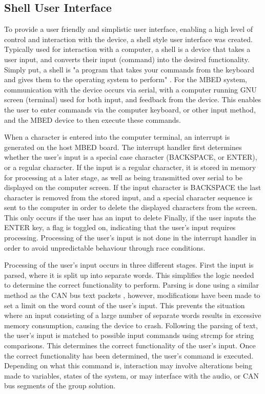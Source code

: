 \subsection*{Shell User Interface}

To provide a user friendly and simplistic user interface, enabling a high level 
of control and interaction with the device, a shell style user interface was 
created. 
Typically used for interaction with a computer, a shell is a device that takes 
a user input, and converts their input (command) into the desired functionality. 
Simply put, a shell is "a program that takes your commands from the keyboard and 
gives them to the operating system to perform" \cite{shell-def}.
For the MBED system, communication with the device occurs via serial, with a 
computer running GNU screen (terminal) used for both input, and feedback from 
the device. 
This enables the user to enter commands via the computer keyboard, or other input
method, and the MBED device to then execute these commands. 
\par\bigskip\noindent
When a character is entered into the computer terminal, an interrupt is generated
on the host MBED board. 
The interrupt handler first determines whether the user's input is a special case 
character (BACKSPACE, or ENTER), or a regular character. 
If the input is a regular character, it is stored in memory for processing at a 
later stage, as well as being transmitted over serial to be displayed on the 
computer screen. 
If the input character is BACKSPACE the last character is removed from the 
stored input, and a special character sequence is sent to the computer in order 
to delete the displayed characters from the screen. This only occurs if the 
user has an input to delete 
Finally, if the user inputs the ENTER key, a flag is toggled on, indicating that 
the user's input requires processing. Processing of the user's input is not done 
in the interrupt handler in order to avoid unpredictable behaviour through race 
conditions.  
\par\bigskip\noindent
Processing of the user's input occurs in three different stages. 
First the input is parsed, where it is split up into separate words. This 
simplifies the logic needed to determine the correct functionality to perform.
Parsing is done using a similar method as the CAN bus text packets \cite{text-parser}, 
however, modifications have been made to set a limit on the word count of the 
user's input. This prevents the situation where an input consisting of a large 
number of separate words results in excessive memory consumption, causing the 
device to crash. 
Following the parsing of text, the user's input is matched to possible input 
commands using strcmp for string comparisons. This determines the correct 
functionality of the user's input. 
Once the correct functionality has been determined, the user's command is executed. 
Depending on what this command is, interaction may involve alterations being made 
to variables, states of the system, or may interface with the audio, or CAN bus 
segments of the group solution. 

